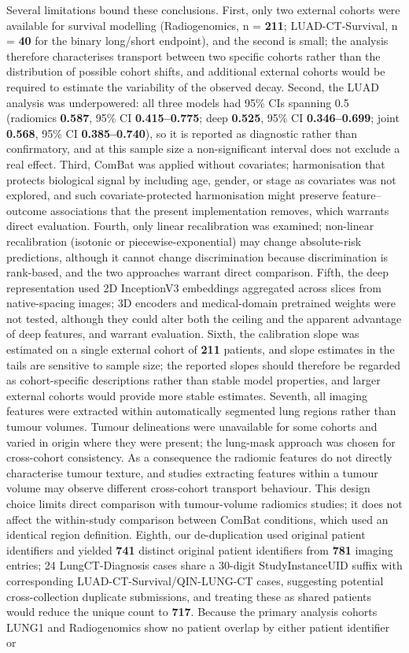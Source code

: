 \documentclass[a4paper,fleqn]{cas-sc}
\begin{document}
Several limitations bound these conclusions. First, only two external cohorts were available for survival modelling (Radiogenomics, n = \textbf{211}; LUAD-CT-Survival, n = \textbf{40} for the binary long/short endpoint), and the second is small; the analysis therefore characterises transport between two specific cohorts rather than the distribution of possible cohort shifts, and additional external cohorts would be required to estimate the variability of the observed decay. Second, the LUAD analysis was underpowered: all three models had 95\% CIs spanning 0.5 (radiomics \textbf{0.587}, 95\% CI \textbf{0.415--0.775}; deep \textbf{0.525}, 95\% CI \textbf{0.346--0.699}; joint \textbf{0.568}, 95\% CI \textbf{0.385--0.740}), so it is reported as diagnostic rather than confirmatory, and at this sample size a non-significant interval does not exclude a real effect. Third, ComBat was applied without covariates; harmonisation that protects biological signal by including age, gender, or stage as covariates was not explored, and such covariate-protected harmonisation might preserve feature--outcome associations that the present implementation removes, which warrants direct evaluation. Fourth, only linear recalibration was examined; non-linear recalibration (isotonic or piecewise-exponential) may change absolute-risk predictions, although it cannot change discrimination because discrimination is rank-based, and the two approaches warrant direct comparison. Fifth, the deep representation used 2D InceptionV3 embeddings aggregated across slices from native-spacing images; 3D encoders and medical-domain pretrained weights were not tested, although they could alter both the ceiling and the apparent advantage of deep features, and warrant evaluation. Sixth, the calibration slope was estimated on a single external cohort of \textbf{211} patients, and slope estimates in the tails are sensitive to sample size; the reported slopes should therefore be regarded as cohort-specific descriptions rather than stable model properties, and larger external cohorts would provide more stable estimates. Seventh, all imaging features were extracted within automatically segmented lung regions rather than tumour volumes. Tumour delineations were unavailable for some cohorts and varied in origin where they were present; the lung-mask approach was chosen for cross-cohort consistency. As a consequence the radiomic features do not directly characterise tumour texture, and studies extracting features within a tumour volume may observe different cross-cohort transport behaviour. This design choice limits direct comparison with tumour-volume radiomics studies; it does not affect the within-study comparison between ComBat conditions, which used an identical region definition. Eighth, our de-duplication used original patient identifiers and yielded \textbf{741} distinct original patient identifiers from \textbf{781} imaging entries; 24 LungCT-Diagnosis cases share a 30-digit StudyInstanceUID suffix with corresponding LUAD-CT-Survival/QIN-LUNG-CT cases, suggesting potential cross-collection duplicate submissions, and treating these as shared patients would reduce the unique count to \textbf{717}. Because the primary analysis cohorts LUNG1 and Radiogenomics show no patient overlap by either patient identifier or 
\end{document}
